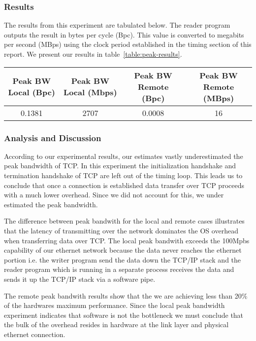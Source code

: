 \subsubsection{Results}
The results from this experiment are tabulated below. The reader program outputs the result in bytes per cycle (Bpc). This value is converted to megabits per second (MBps) using the clock period established in the timing section of this report. We present our results in table~\ref{table:peak-results}.

\begin{table*}[b]
\begin{tabular}{|c|c|c|c|}
\hline
Peak BW Local (Bpc) & Peak BW Local (Mbps) & Peak BW Remote (Bpc) & Peak BW Remote (MBps) \\ \hline
0.1381            & 2707          & 0.0008            & 16          \\ \hline
\end{tabular}
\caption{Peak bandwidth experimental results}
\label{table:peak-results}
\end{table*}

\subsubsection{Analysis and Discussion}
According to our experimental results, our estimates vastly underestimated the peak bandwidth of TCP.
In this experiment the initialization handshake and termination handshake of TCP are left out of the timing loop. This leads us to conclude that once a connection is established data transfer over TCP 
proceeds with a much lower overhead. Since we did not account for this, we under estimated the peak
bandwidth.

The difference between peak bandwith for the local and remote cases illustrates that the latency of 
transmitting over the network dominates the OS overhead when transferring data over TCP. The local 
peak bandwith exceeds the 100Mpbs capability of our ethernet network because the data never reaches
the ethernet portion i.e. the writer program send the data down the TCP/IP stack and the reader 
program which is running in a separate process receives the data and sends it up the TCP/IP stack via
 a software pipe. 

The remote peak bandwith results show that the we are achieving less than 20\% of the hardwares 
maximum performance. Since the local peak bandwidth experiment indicates that software is not the 
bottleneck we must conclude that the bulk of the overhead resides in hardware at the link layer and
physical ethernet connection. 

